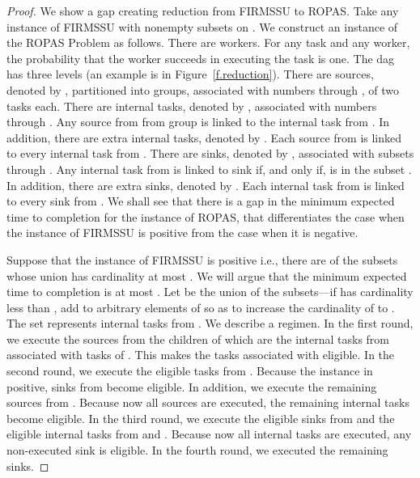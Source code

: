\documentclass[letterpaper,11pt]{article}
\begin{document}
{\begin{proof}
We show a gap creating reduction from FIRMSSU to ROPAS.
Take any instance of FIRMSSU with  nonempty subsets  on . 
We construct an instance of the ROPAS Problem as follows. 
There are  workers. For any task and any worker, the probability that the worker succeeds in executing the task is one. The dag has three levels (an example is in Figure~\ref{f.reduction}). There are  sources, denoted by , partitioned into  groups, associated with numbers  through , of two tasks each. There are  internal tasks, denoted by , associated with numbers  through . Any source from  from group  is linked to the internal task  from . In addition, there are  extra internal tasks, denoted by . Each source from  is linked to every internal task from . There are  sinks, denoted by , associated with subsets  through . Any internal task  from  is linked to sink  if, and only if,  is in the subset . In addition, there are  extra sinks, denoted by . Each internal task from  is linked to every sink from .
We shall see that there is a gap in the minimum expected time to completion for the instance of ROPAS, that differentiates the case when the instance of FIRMSSU is positive from the case when it is negative. 


Suppose that the instance of FIRMSSU is positive i.e., there are  of the subsets whose union has cardinality at most . We will argue that the minimum expected time to completion is at most . Let  be the union of the  subsets---if  has cardinality less than , add to  arbitrary elements of  so as to increase the cardinality of  to . The set  represents  internal tasks from . 
We describe a regimen. In the first round, we execute the  sources from  the children of which are the  internal tasks from  associated with tasks of . This makes the tasks associated with  eligible. In the second round, we execute the  eligible tasks from . Because the instance in positive,  sinks from  become eligible. In addition, we execute the remaining  sources from . Because now all sources are executed, the remaining  internal tasks become eligible. In the third round, we execute the  eligible sinks from  and the  eligible internal tasks from  and . Because now all internal tasks are executed, any non-executed sink is eligible. In the fourth round, we executed the remaining  sinks.


\end{proof}}
\end{document}
